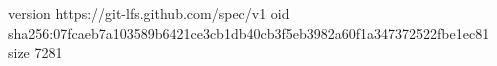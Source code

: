 version https://git-lfs.github.com/spec/v1
oid sha256:07fcaeb7a103589b6421ce3cb1db40cb3f5eb3982a60f1a347372522fbe1ec81
size 7281
